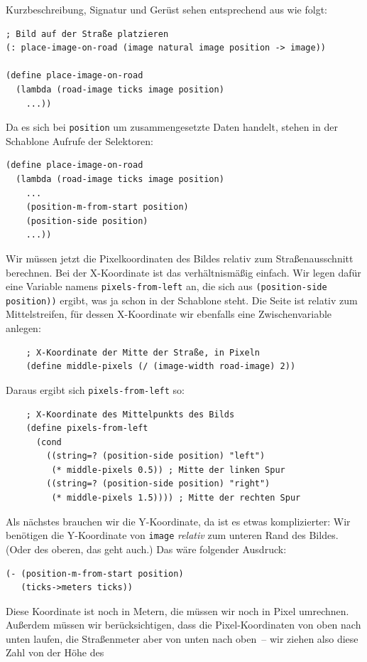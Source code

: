 Kurzbeschreibung, Signatur und Gerüst sehen entsprechend aus wie
folgt:
%
\begin{lstlisting}
; Bild auf der Straße platzieren
(: place-image-on-road (image natural image position -> image))

(define place-image-on-road
  (lambda (road-image ticks image position)
    ...))
\end{lstlisting}
%
Da es sich bei \lstinline{position} um zusammengesetzte Daten handelt,
stehen in der Schablone Aufrufe der Selektoren:
%
\begin{lstlisting}
(define place-image-on-road
  (lambda (road-image ticks image position)
    ...
    (position-m-from-start position)
    (position-side position)
    ...))
\end{lstlisting}
%
Wir müssen jetzt die Pixelkoordinaten des Bildes relativ zum
Straßenausschnitt berechnen.  Bei der X-Koordinate ist das
verhältnismäßig einfach.  Wir legen dafür eine Variable namens
\lstinline{pixels-from-left} an, die sich aus 
\lstinline{(position-side position))} ergibt, 
was ja schon in der Schablone steht.  Die Seite
ist relativ zum Mittelstreifen, für dessen X-Koordinate wir ebenfalls
eine Zwischenvariable anlegen:
%
\begin{lstlisting}
    ; X-Koordinate der Mitte der Straße, in Pixeln
    (define middle-pixels (/ (image-width road-image) 2))
\end{lstlisting}
%
Daraus ergibt sich \lstinline{pixels-from-left} so:
%
\begin{lstlisting}
    ; X-Koordinate des Mittelpunkts des Bilds
    (define pixels-from-left
      (cond
        ((string=? (position-side position) "left")
         (* middle-pixels 0.5)) ; Mitte der linken Spur
        ((string=? (position-side position) "right")
         (* middle-pixels 1.5)))) ; Mitte der rechten Spur
\end{lstlisting}
%
Als nächstes brauchen wir die Y-Koordinate, da ist es etwas
komplizierter: Wir benötigen die Y-Koordinate von \lstinline{image}
\emph{relativ} zum unteren Rand des Bildes.  (Oder des oberen, das
geht auch.)  Das wäre folgender Ausdruck:
%
\begin{lstlisting}
(- (position-m-from-start position)
   (ticks->meters ticks))
\end{lstlisting}
%
Diese Koordinate ist noch in Metern, die müssen wir noch in Pixel
umrechnen.  Außerdem müssen wir berücksichtigen, dass die
Pixel-Koordinaten von oben nach unten laufen, die Straßenmeter aber
von unten nach oben~-- wir ziehen also diese Zahl von der Höhe des
